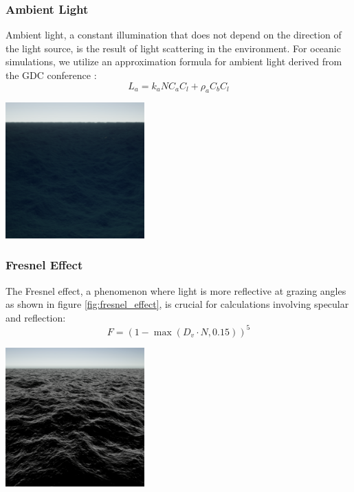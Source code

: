 \subsubsection{Ambient Light}
Ambient light, a constant illumination that does not depend on the direction of the light source, is the result of light scattering in the environment. For oceanic simulations, we utilize an approximation formula for ambient light derived from the GDC conference \cite{mark2021}: 
\begin{equation}
    L_a = k_a N C_a C_l + \rho_a C_b C_l
\end{equation}
\begin{minipage}{1\textwidth}
    \centering
    \includegraphics[width=0.40\textwidth]{"images/ambient_light.png"}
    \label{fig:ambient_light}
\end{minipage}

\subsubsection{Fresnel Effect}
The Fresnel effect, a phenomenon where light is more reflective at grazing angles as shown in figure \ref{fig:fresnel_effect}, is crucial for calculations involving specular and reflection:
\begin{equation}
    F = (1 - \max(D_v \cdot N, 0.15))^{5}
\end{equation}
\begin{minipage}{1\textwidth}
    \centering
    \includegraphics[width=0.40\textwidth]{"images/fresnel.png"}
    \label{fig:fresnel_effect}
\end{minipage}

